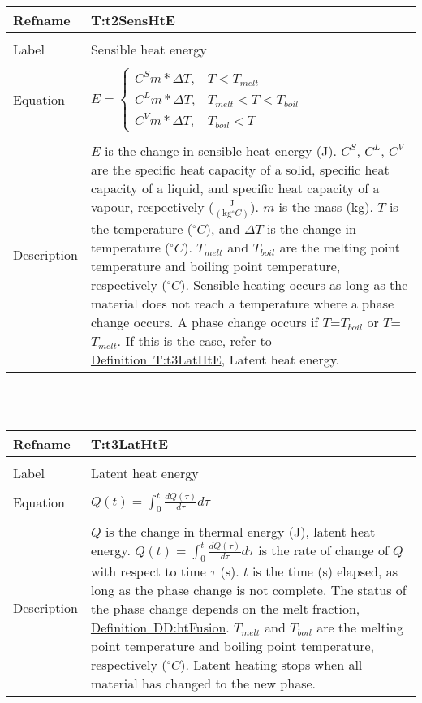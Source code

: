 \documentclass[12pt]{article}
\begin{document}
\noindent \begin{minipage}{\textwidth}
\begin{tabular}{p{} p{}}
\toprule \textbf{Refname} & \textbf{T:t2SensHtE}
\label{T:t2SensHtE}
\\ \midrule \\
Label & Sensible heat energy
\\ \midrule \\
Equation & $E=\begin{cases}
C^{S}m*\Delta{}T, & T<T_{melt}\\
C^{L}m*\Delta{}T, & T_{melt}<T<T_{boil}\\
C^{V}m*\Delta{}T, & T_{boil}<T
\end{cases}$
\\ \midrule \\
Description & $E$ is the change in sensible heat energy (J). $C^{S}$, $C^{L}$, $C^{V}$ are the specific heat capacity of a solid, specific heat capacity of a liquid, and specific heat capacity of a vapour, respectively ($\frac{\text{J}}{(\text{kg}{}^{\circ}C)}$). $m$ is the mass (kg). $T$ is the temperature (${}^{\circ}C$), and $\Delta{}T$ is the change in temperature (${}^{\circ}C$). $T_{melt}$ and $T_{boil}$ are the melting point temperature and boiling point temperature, respectively (${}^{\circ}C$). Sensible heating occurs as long as the material does not reach a temperature where a phase change occurs. A phase change occurs if $T$=$T_{boil}$ or $T$=$T_{melt}$. If this is the case, refer to \hyperref[T:t3LatHtE]{Definition~T:t3LatHtE}, Latent heat energy.
\\ \bottomrule \end{tabular}
\end{minipage}\\
~\newline
\noindent \begin{minipage}{\textwidth}
\begin{tabular}{p{} p{}}
\toprule \textbf{Refname} & \textbf{T:t3LatHtE}
\label{T:t3LatHtE}
\\ \midrule \\
Label & Latent heat energy
\\ \midrule \\
Equation & $Q\left(t\right)=\int_{0}^{t}{\frac{dQ\left(\tau{}\right)}{d\tau{}}d\tau{}}$
\\ \midrule \\
Description & $Q$ is the change in thermal energy (J), latent heat energy. $Q\left(t\right)=\int_{0}^{t}{\frac{dQ\left(\tau{}\right)}{d\tau{}}d\tau{}}$ is the rate of change of $Q$ with respect to time $\tau{}$ (s). $t$ is the time (s) elapsed, as long as the phase change is not complete. The status of the phase change depends on the melt fraction, \hyperref[DD:htFusion]{Definition~DD:htFusion}. $T_{melt}$ and $T_{boil}$ are the melting point temperature and boiling point temperature, respectively (${}^{\circ}C$). Latent heating stops when all material has changed to the new phase.
\\ \bottomrule \end{tabular}
\end{minipage}\\
\end{document}
